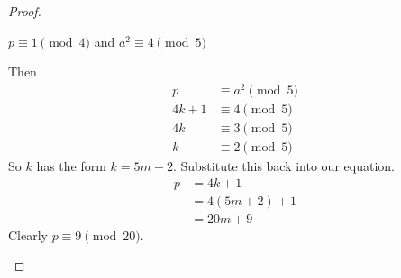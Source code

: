 \begin{proof}
\begin{case}
$p \equiv 1 \pmod 4$ and $a^2 \equiv 4 \pmod 5$

Then
\begin{align*}
		  p &\equiv a^2 \pmod 5 \\
	 4k + 1 &\equiv 4 \pmod 5 \\
	     4k &\equiv 3 \pmod 5 \\
	      k &\equiv 2 \pmod 5
\end{align*}
So $k$ has the form $k=5m+2$. Substitute this back into our equation.
\begin{align*}
	p &= 4k + 1 \\
	  &= 4(5m+2) + 1 \\
	  &= 20m + 9
\end{align*}
Clearly $p \equiv 9 \pmod{20}$.
\end{case}

\end{proof}

